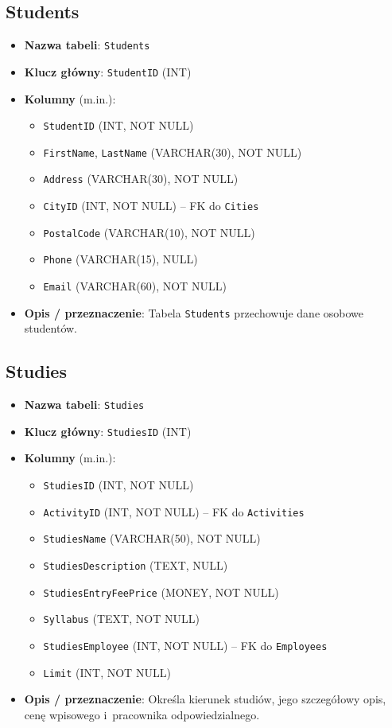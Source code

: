 \documentclass[12pt]{article}
\begin{document}
\subsection{Students}
\begin{itemize}
    \item \textbf{Nazwa tabeli}: \texttt{Students}
    \item \textbf{Klucz główny}: \texttt{StudentID} (INT)
    \item \textbf{Kolumny} (m.in.):
          \begin{itemize}
            \item \texttt{StudentID} (INT, NOT NULL)
            \item \texttt{FirstName}, \texttt{LastName} (VARCHAR(30), NOT NULL)
            \item \texttt{Address} (VARCHAR(30), NOT NULL)
            \item \texttt{CityID} (INT, NOT NULL) -- FK do \texttt{Cities}
            \item \texttt{PostalCode} (VARCHAR(10), NOT NULL)
            \item \texttt{Phone} (VARCHAR(15), NULL)
            \item \texttt{Email} (VARCHAR(60), NOT NULL)
          \end{itemize}
    \item \textbf{Opis / przeznaczenie}:  
          Tabela \texttt{Students} przechowuje dane osobowe studentów.
\end{itemize}

\subsection{Studies}
\begin{itemize}
    \item \textbf{Nazwa tabeli}: \texttt{Studies}
    \item \textbf{Klucz główny}: \texttt{StudiesID} (INT)
    \item \textbf{Kolumny} (m.in.):
          \begin{itemize}
            \item \texttt{StudiesID} (INT, NOT NULL)
            \item \texttt{ActivityID} (INT, NOT NULL) -- FK do \texttt{Activities}
            \item \texttt{StudiesName} (VARCHAR(50), NOT NULL)
            \item \texttt{StudiesDescription} (TEXT, NULL)
            \item \texttt{StudiesEntryFeePrice} (MONEY, NOT NULL)
            \item \texttt{Syllabus} (TEXT, NOT NULL)
            \item \texttt{StudiesEmployee} (INT, NOT NULL) -- FK do \texttt{Employees}
            \item \texttt{Limit} (INT, NOT NULL)
          \end{itemize}
    \item \textbf{Opis / przeznaczenie}:  
          Określa kierunek studiów, jego szczegółowy opis, cenę wpisowego i~pracownika odpowiedzialnego.
\end{itemize}
\newpage
\end{document}
